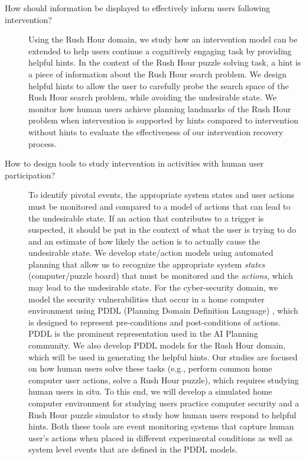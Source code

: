 \begin{description}
\item[How should information be displayed to effectively inform users following intervention?] Using the Rush Hour domain, we study how an intervention model can be extended to help users continue a cognitively engaging task by providing helpful hints. 
In the context of the Rush Hour puzzle solving task, a hint is a piece of information about the Rush Hour search problem. 
We design helpful hints to allow the user to carefully probe the search space of the Rush Hour search problem, while avoiding the undesirable state.
We monitor how human users achieve planning landmarks of the Rush Hour problem when intervention is supported by hints compared to intervention without hints to evaluate the effectiveness of our intervention recovery process.

\item[How to design tools to study intervention in activities with human user participation?]
To identify pivotal events, the appropriate system states and user actions must be monitored and compared to a model of actions that can lead to the undesirable state. 
If an action that contributes to a trigger is suspected, it should be put in the context of what the user is trying to do and an estimate of how likely the action is to actually cause the undesirable state. 
We develop state/action models using automated planning that allow us to recognize the appropriate system \textit{states} (computer/puzzle board) that must be monitored and the \textit{actions}, which may lead to the undesirable state. 
For the cyber-security domain, we model the security vulnerabilities that occur in a home computer environment using PDDL (Planning Domain Definition Language) \cite{ghallab1998}, which is designed to represent pre-conditions and post-conditions of actions. 
PDDL is the prominent representation used in the AI Planning community. 
We also develop PDDL models for the Rush Hour domain, which will be used in generating the helpful hints. 
Our studies are focused on how human users solve these tasks (e.g., perform common home computer user actions, solve a Rush Hour puzzle), which requires studying human users in situ. 
To this end, we will develop a simulated home computer environment for studying users practice computer security and a Rush Hour puzzle simulator to study how human users respond to helpful hints. 
Both these tools are event monitoring systems that capture human user's actions when placed in different experimental conditions as well as system level events that are defined in the PDDL models.
\end{description}


